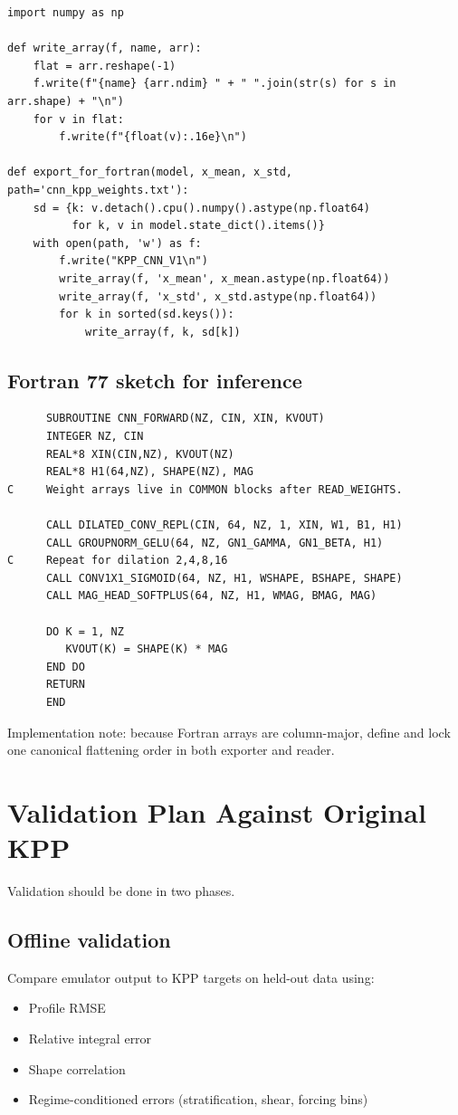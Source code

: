 \documentclass[11pt, a4paper]{article}
\begin{document}
\begin{verbatim}
import numpy as np

def write_array(f, name, arr):
    flat = arr.reshape(-1)
    f.write(f"{name} {arr.ndim} " + " ".join(str(s) for s in arr.shape) + "\n")
    for v in flat:
        f.write(f"{float(v):.16e}\n")

def export_for_fortran(model, x_mean, x_std, path='cnn_kpp_weights.txt'):
    sd = {k: v.detach().cpu().numpy().astype(np.float64)
          for k, v in model.state_dict().items()}
    with open(path, 'w') as f:
        f.write("KPP_CNN_V1\n")
        write_array(f, 'x_mean', x_mean.astype(np.float64))
        write_array(f, 'x_std', x_std.astype(np.float64))
        for k in sorted(sd.keys()):
            write_array(f, k, sd[k])
\end{verbatim}

\subsection{Fortran 77 sketch for inference}

\begin{verbatim}
      SUBROUTINE CNN_FORWARD(NZ, CIN, XIN, KVOUT)
      INTEGER NZ, CIN
      REAL*8 XIN(CIN,NZ), KVOUT(NZ)
      REAL*8 H1(64,NZ), SHAPE(NZ), MAG
C     Weight arrays live in COMMON blocks after READ_WEIGHTS.

      CALL DILATED_CONV_REPL(CIN, 64, NZ, 1, XIN, W1, B1, H1)
      CALL GROUPNORM_GELU(64, NZ, GN1_GAMMA, GN1_BETA, H1)
C     Repeat for dilation 2,4,8,16
      CALL CONV1X1_SIGMOID(64, NZ, H1, WSHAPE, BSHAPE, SHAPE)
      CALL MAG_HEAD_SOFTPLUS(64, NZ, H1, WMAG, BMAG, MAG)

      DO K = 1, NZ
         KVOUT(K) = SHAPE(K) * MAG
      END DO
      RETURN
      END
\end{verbatim}

Implementation note: because Fortran arrays are column-major, define and lock one canonical flattening order in both exporter and reader.

\section{Validation Plan Against Original KPP}

Validation should be done in two phases.

\subsection{Offline validation}
Compare emulator output to KPP targets on held-out data using:
\begin{itemize}
    \item Profile RMSE
    \item Relative integral error
    \item Shape correlation
    \item Regime-conditioned errors (stratification, shear, forcing bins)
\end{itemize}
\end{document}

